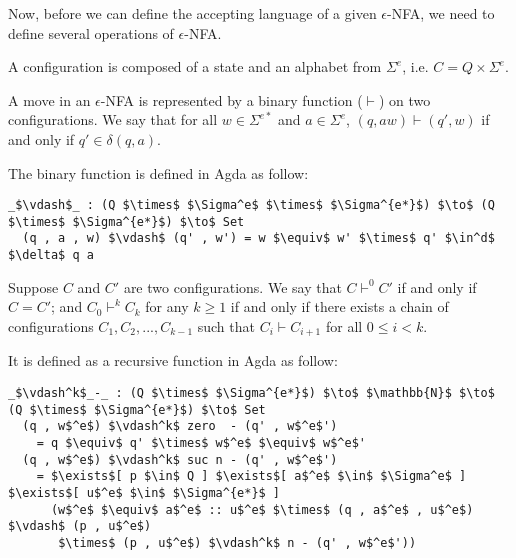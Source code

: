 \par Now, before we can define the accepting language of a given
\(\epsilon\)-NFA, we need to define several operations of
\(\epsilon\)-NFA. 

\begin{defn}
\noindent A configuration is composed of a state and an alphabet from
\(\Sigma^e\), i.e. \(C = Q \times \Sigma^e\). 
\end{defn}

\begin{defn}
\noindent A move in an \(\epsilon\)-NFA is
represented by a binary function (\(\vdash\)) on two configurations. We say
that for all \(w \in \Sigma^{e*}\) and \(a \in \Sigma^e\), \((q, aw)
\vdash (q' , w)\) if and only if \(q' \in \delta (q , a)\). 
\end{defn}

\par The binary function is defined in Agda as follow: 
\begin{lstlisting}[mathescape=true,xleftmargin=.1\textwidth]
  _$\vdash$_ : (Q $\times$ $\Sigma^e$ $\times$ $\Sigma^{e*}$) $\to$ (Q $\times$ $\Sigma^{e*}$) $\to$ Set
  (q , a , w) $\vdash$ (q' , w') = w $\equiv$ w' $\times$ q' $\in^d$ $\delta$ q a
\end{lstlisting}

\begin{defn}
\noindent Suppose \(C\) and \(C'\) are two configurations. We say that \(C \vdash^0 C'\) if and only
if \(C = C'\); and \(C_0 \vdash^k C_k\) for any \(k \geq 1\) if and only if there exists a chain of
configurations \(C_1, C_2, ..., C_{k-1}\) such that \(C_i \vdash C_{i+1}\) for all \(0 \leq i < k\). 
\end{defn}

\par It is defined as a recursive function in Agda as follow: 
\begin{lstlisting}[mathescape=true,xleftmargin=.1\textwidth]
  _$\vdash^k$_-_ : (Q $\times$ $\Sigma^{e*}$) $\to$ $\mathbb{N}$ $\to$ (Q $\times$ $\Sigma^{e*}$) $\to$ Set
  (q , w$^e$) $\vdash^k$ zero  - (q' , w$^e$')
    = q $\equiv$ q' $\times$ w$^e$ $\equiv$ w$^e$'
  (q , w$^e$) $\vdash^k$ suc n - (q' , w$^e$') 
    = $\exists$[ p $\in$ Q ] $\exists$[ a$^e$ $\in$ $\Sigma^e$ ] $\exists$[ u$^e$ $\in$ $\Sigma^{e*}$ ]
      (w$^e$ $\equiv$ a$^e$ :: u$^e$ $\times$ (q , a$^e$ , u$^e$) $\vdash$ (p , u$^e$) 
       $\times$ (p , u$^e$) $\vdash^k$ n - (q' , w$^e$'))
\end{lstlisting}

